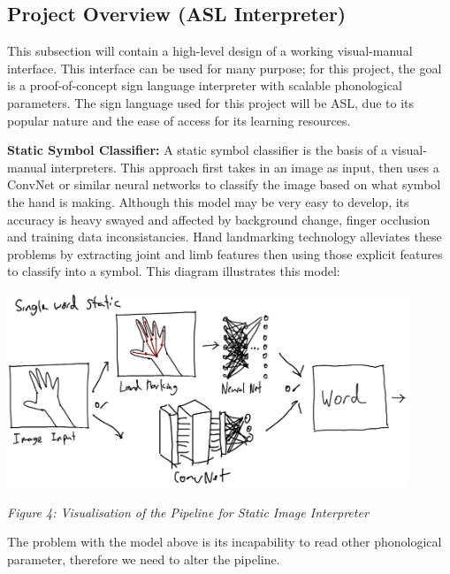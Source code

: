 \documentclass[11pt]{article}
\def\paraskip{\vskip 0.4cm}
\begin{document}
    \subsection{Project Overview (ASL Interpreter)}
        This subsection will contain a high-level design of a working visual-manual interface. This interface can be used for many purpose; for this project, the goal is a proof-of-concept sign language interpreter with scalable phonological parameters. The sign language used for this project will be ASL, due to its popular nature and the ease of access for its learning resources. 

        \paraskip

        \noindent\textbf{Static Symbol Classifier: } A static symbol classifier is the basis of a visual-manual interpreters. This approach first takes in an image as input, then uses a ConvNet or similar neural networks to classify the image based on what symbol the hand is making. Although this model may be very easy to develop, its accuracy is heavy swayed and affected by background change, finger occlusion and training data inconsistancies. Hand landmarking technology alleviates these problems by extracting joint and limb features then using those explicit features to classify into a symbol. This diagram illustrates this model:

        \begin{center}
            \includegraphics[width=12cm]{images/staticModel.png}
            \\
            \raggedright \textit{
            Figure 4: Visualisation of the Pipeline for Static Image Interpreter
            }
        \end{center}

        The problem with the model above is its incapability to read other phonological parameter, therefore we need to alter the pipeline. 
        
        \paraskip
\end{document}
